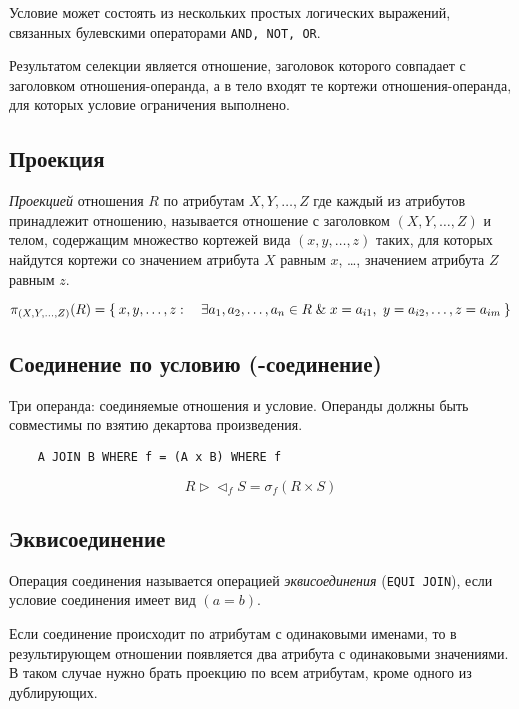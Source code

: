 Условие может состоять из нескольких простых логических выражений, связанных булевскими операторами \texttt{AND, NOT, OR}.

Результатом селекции является отношение, заголовок которого совпадает с заголовком отношения-операнда, а в тело входят те кортежи отношения-операнда, для которых условие ограничения выполнено.

\subsection*{Проекция}

\begin{definition}
	\emph{Проекцией} отношения $ R $ по атрибутам $ X, Y, \dots, Z $ где каждый из атрибутов принадлежит отношению, называется отношение с заголовком $ (X, Y, \dots, Z) $ и телом, содержащим множество кортежей вида $ (x, y, \dots, z) $ таких, для которых найдутся кортежи со значением атрибута $ X $ равным $ x $, \dots, значением атрибута $ Z $ равным $ z $.
\end{definition}

$$ \pi_{(X, Y, \dots, Z)}(R) = \Set{x, y, \dots, z : \quad \exists a_1, a_2, \dots, a_n \in R \ensuremath{\mathrel\&}x = a_{i1}, ~ y = a_{i2}, \dots, z = a_{im}} $$

\subsection*{Соединение по условию (-соединение)}

Три операнда: соединяемые отношения и условие.
Операнды должны быть совместимы по взятию декартова произведения.

\begin{verbatim}
	A JOIN B WHERE f = (A x B) WHERE f
\end{verbatim}

$$ R \vartriangleright\vartriangleleft_f S = \sigma_f (R \times S) $$

\subsection*{Эквисоединение}

\begin{definition}
	Операция соединения называется операцией \emph{эквисоединения} (\texttt{EQUI JOIN}), если условие соединения имеет вид $ (a = b) $.
\end{definition}

Если соединение происходит по атрибутам с одинаковыми именами, то в результирующем отношении появляется два атрибута с одинаковыми значениями.
В таком случае нужно брать проекцию по всем атрибутам, кроме одного из дублирующих.

